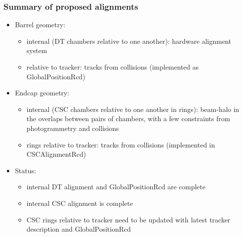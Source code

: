 \documentclass[compress]{beamer}
\begin{document}
\begin{frame}
\frametitle{Summary of proposed alignments}

\begin{itemize}
\item Barrel geometry:
\begin{itemize}
\item internal (DT chambers relative to one another): hardware alignment system
\item relative to tracker: tracks from collisions (implemented as GlobalPositionRcd)
\end{itemize}

\item Endcap geometry:
\begin{itemize}
\item internal (CSC chambers relative to one another in rings): beam-halo in the overlaps between pairs of chambers, with a few constraints from photogrammetry and collisions
\item rings relative to tracker: tracks from collisions (implemented in CSCAlignmentRcd)
\end{itemize}

\item Status:
\begin{itemize}
\item internal DT alignment and GlobalPositionRcd are complete
\item internal CSC alignment is complete
\item CSC rings relative to tracker need to be updated with latest tracker description and GlobalPositionRcd
\end{itemize}

\end{itemize}

\label{numpages}
\end{frame}
\end{document}
